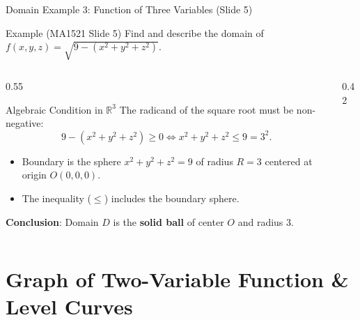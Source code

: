 \documentclass[aspectratio=169,10pt]{beamer}
\begin{document}
\begin{frame}{Domain Example 3: Function of Three Variables (Slide 5)}
  \begin{exampleblock}{Example (MA1521 Slide 5)}
    Find and describe the domain of $f(x, y, z) = \sqrt{9 - (x^2 + y^2 + z^2)}$.
  \end{exampleblock}

  \begin{columns}[T]
    \begin{column}{0.55\textwidth}
      \begin{block}{Algebraic Condition in $\mathbb{R}^3$}
        \small
        The radicand of the square root must be non-negative:
        \[
          9 - (x^2 + y^2 + z^2) \ge 0 \iff x^2 + y^2 + z^2 \le 9 = 3^2.
        \]
        \begin{itemize}
          \item Boundary is the sphere $x^2 + y^2 + z^2 = 9$ of radius $R = 3$ centered at origin $O(0,0,0)$.
          \item The inequality ($\le$) includes the boundary sphere.
        \end{itemize}
        \textbf{Conclusion}: Domain $D$ is the \textbf{solid ball} of center $O$ and radius $3$.
      \end{block}
    \end{column}

    \begin{column}{0.42\textwidth}
      \centering
    \end{column}
  \end{columns}
\end{frame}

\section{Graph of Two-Variable Function \& Level Curves}
\end{document}
